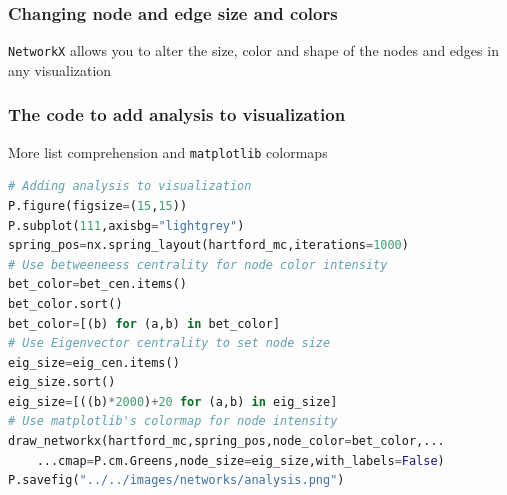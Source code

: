 \documentclass[xcolor=dvipsnames, 9pt]{beamer}
\begin{document}
\begin{frame}[fragile]
    \frametitle{Changing node and edge size and colors}
    \texttt{NetworkX} allows you to alter the size, color and shape of the nodes and edges in any visualization
\end{frame}

\begin{frame}[fragile]
    \frametitle{The code to add analysis to visualization}
    \begin{block}{More list comprehension and \texttt{matplotlib} colormaps}
        \scriptsize{\begin{lstlisting}[language=Python]
# Adding analysis to visualization
P.figure(figsize=(15,15))
P.subplot(111,axisbg="lightgrey")
spring_pos=nx.spring_layout(hartford_mc,iterations=1000)
# Use betweeneess centrality for node color intensity
bet_color=bet_cen.items()
bet_color.sort()
bet_color=[(b) for (a,b) in bet_color]
# Use Eigenvector centrality to set node size
eig_size=eig_cen.items()
eig_size.sort()
eig_size=[((b)*2000)+20 for (a,b) in eig_size]
# Use matplotlib's colormap for node intensity 
draw_networkx(hartford_mc,spring_pos,node_color=bet_color,...
    ...cmap=P.cm.Greens,node_size=eig_size,with_labels=False)
P.savefig("../../images/networks/analysis.png")
        \end{lstlisting}}
    \end{block}
\end{frame}
\end{document}
